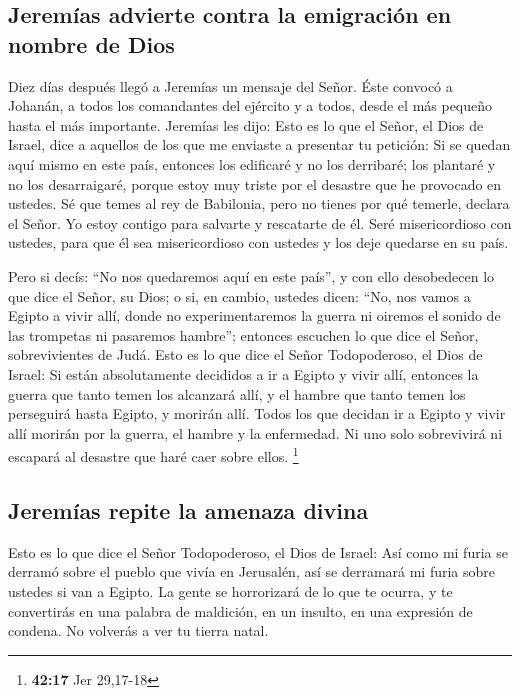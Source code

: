 \hypertarget{jeremuxedas-advierte-contra-la-emigraciuxf3n-en-nombre-de-dios}{%
\subsection{Jeremías advierte contra la emigración en nombre de
Dios}\label{jeremuxedas-advierte-contra-la-emigraciuxf3n-en-nombre-de-dios}}

 Diez días después llegó a Jeremías un mensaje del Señor.
 Éste convocó a Johanán, a todos los comandantes del
ejército y a todos, desde el más pequeño hasta el más importante.
 Jeremías les dijo: Esto es lo que el Señor, el Dios de
Israel, dice a aquellos de los que me enviaste a presentar tu petición:
 Si se quedan aquí mismo en este país, entonces los
edificaré y no los derribaré; los plantaré y no los desarraigaré, porque
estoy muy triste por el desastre que he provocado en ustedes.
 Sé que temes al rey de Babilonia, pero no tienes por qué
temerle, declara el Señor. Yo estoy contigo para salvarte y rescatarte
de él.  Seré misericordioso con ustedes, para que él sea
misericordioso con ustedes y los deje quedarse en su país.

 Pero si decís: ``No nos quedaremos aquí en este país'',
y con ello desobedecen lo que dice el Señor, su Dios;  o
si, en cambio, ustedes dicen: ``No, nos vamos a Egipto a vivir allí,
donde no experimentaremos la guerra ni oiremos el sonido de las
trompetas ni pasaremos hambre'';  entonces escuchen lo
que dice el Señor, sobrevivientes de Judá. Esto es lo que dice el Señor
Todopoderoso, el Dios de Israel: Si están absolutamente decididos a ir a
Egipto y vivir allí,  entonces la guerra que tanto temen
los alcanzará allí, y el hambre que tanto temen los perseguirá hasta
Egipto, y morirán allí.  Todos los que decidan ir a
Egipto y vivir allí morirán por la guerra, el hambre y la enfermedad. Ni
uno solo sobrevivirá ni escapará al desastre que haré caer sobre ellos.
\footnote{\textbf{42:17} Jer 29,17-18}

\hypertarget{jeremuxedas-repite-la-amenaza-divina}{%
\subsection{Jeremías repite la amenaza
divina}\label{jeremuxedas-repite-la-amenaza-divina}}

 Esto es lo que dice el Señor Todopoderoso, el Dios de
Israel: Así como mi furia se derramó sobre el pueblo que vivía en
Jerusalén, así se derramará mi furia sobre ustedes si van a Egipto. La
gente se horrorizará de lo que te ocurra, y te convertirás en una
palabra de maldición, en un insulto, en una expresión de condena. No
volverás a ver tu tierra natal.

